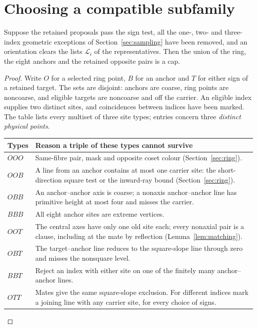 

\section{Choosing a compatible subfamily}\label{sec:choose}
\begin{lemma}\label{lem:triples}
Suppose the retained proposals pass the sign test, all the one-, two- and three-index geometric exceptions of Section~\ref{sec:sampling} have been removed, and an orientation clears the lists $\mathcal L_i$ of the representatives. Then the union of the ring, the eight anchors and the retained opposite pairs is a cap.
\end{lemma}
\begin{proof}
Write $O$ for a selected ring point, $B$ for an anchor and $T$ for either sign of a retained target. The sets are disjoint: anchors are coarse, ring points are noncoarse, and eligible targets are noncoarse and off the carrier. An eligible index supplies two distinct sites, and coincidences between indices have been marked. The table lists every multiset of three site types; entries concern three \emph{distinct physical points}.
\begin{center}\small\renewcommand{\arraystretch}{1.13}
\begin{tabularx}{\linewidth}{@{}lX@{}}\toprule
Types & Reason a triple of these types cannot survive \\ \midrule
$OOO$ & Same-fibre pair, mask and opposite coset colour (Section~\ref{sec:ring}).\\
$OOB$ & A line from an anchor contains at most one carrier site: the short-direction square test or the inward-ray bound (Section~\ref{sec:ring}).\\
$OBB$ & An anchor--anchor axis is coarse; a nonaxis anchor--anchor line has primitive height at most four and misses the carrier.\\
$BBB$ & All eight anchor sites are extreme vertices.\\
$OOT$ & The central axes have only one old site each; every nonaxial pair is a clause, including at the mate by reflection (Lemma~\ref{lem:matching}).\\
$OBT$ & The target--anchor line reduces to the square-slope line through zero and misses the nonsquare level.\\
$BBT$ & Reject an index with either site on one of the finitely many anchor--anchor lines.\\
$OTT$ & Mates give the same square-slope exclusion. For different indices mark a joining line with any carrier site, for every choice of signs.\\

\end{tabularx}
\end{center}
\end{proof}
